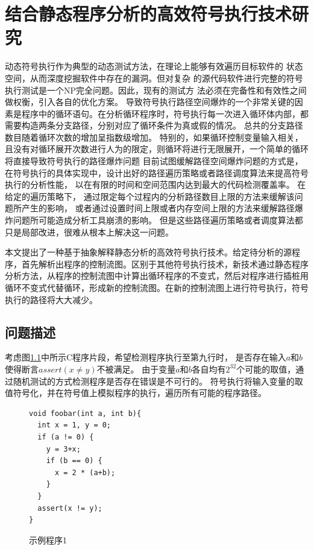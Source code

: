 
\chapter{结合静态程序分析的高效符号执行技术研究}
\label{chap-4}
动态符号执行作为典型的动态测试方法，在理论上能够有效遍历目标软件的
状态空间，从而深度挖掘软件中存在的漏洞。但对复杂
的源代码软件进行完整的符号执行测试是一个NP完全问题。因此，现有的测试方
法必须在完备性和有效性之间做权衡，引入各自的优化方案。%
导致符号执行路径空间爆炸的一个非常关键的因素是程序中的循环语句。在分析循环程序时，符号执行每一次进入循环体内部，都需要构造两条分支路径，分别对应了循环条件为真或假的情况。
总共的分支路径数目随着循环次数的增加呈指数级增加。
特别的，如果循环控制变量输入相关，且没有对循环展开次数进行人为的限定，则循环将进行无限展开，一个简单的循环将直接导致符号执行的路径爆炸问题
目前试图缓解路径空间爆炸问题的方式是，
在符号执行的具体实现中，设计出好的路径遍历策略或者路径调度算法来提高符号执行的分析性能，
以在有限的时间和空间范围内达到最大的代码检测覆盖率。
在给定的遍历策略下，
通过限定每个过程内的分析路径数目上限的方法来缓解该问题所产生的影响，
或者通过设置时间上限或者内存空间上限的方法来缓解路径爆炸问题所可能造成分析工具崩溃的影响。
但是这些路径遍历策略或者调度算法都只是局部改进，很难从根本上解决这一问题。

本文提出了一种基于抽象解释静态分析的高效符号执行技术。给定待分析的源程序，首先解析出程序的控制流图。区别于其他符号执行技术，新技术通过静态程序分析方法，从程序的控制流图中计算出循环程序的不变式，然后对程序进行插桩用循环不变式代替循环，形成新的控制流图。在新的控制流图上进行符号执行，符号执行的路径将大大减少。

\section{问题描述}

考虑图\ref{fig-example1}中所示C程序片段，希望检测程序执行至第九行时，
是否存在输入$a$和$b$使得断言$assert(x \neq y)$不被满足。
由于变量$a$和$b$各自均有$2^{32}$个可能的取值，通过随机测试的方式检测程序是否存在错误是不可行的。
符号执行将输入变量的取值符号化，并在符号值上模拟程序的执行，遍历所有可能的程序路径。

\begin{figure}[h]
\begin{lstlisting}
void foobar(int a, int b){
  int x = 1, y = 0;
  if (a != 0) {
    y = 3+x;
	if (b == 0) {
	  x = 2 * (a+b);
	}
  }
  assert(x != y);
}
\end{lstlisting}
\caption{示例程序1}
\label{fig-example1}
\end{figure}

